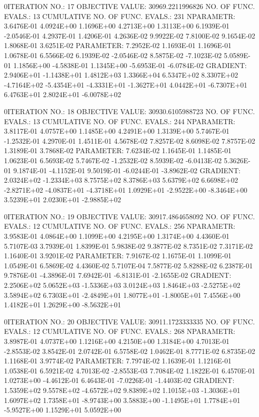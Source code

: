 \documentclass[
  letterpaper,
  toc=chapterentrywithdots,
  listof=totoc,
  11pt,
  headings=small,
  usegeometry]{scrreprt}
\begin{document}
\begin{nonmemlisting}
0ITERATION NO.:   17    OBJECTIVE VALUE:   30969.2211996826        NO. OF FUNC. EVALS.:  13
 CUMULATIVE NO. OF FUNC. EVALS.:      231
 NPARAMETR:  3.6476E-01  4.0924E+00  1.1696E+00  4.2713E+00  1.3113E+00  6.1939E-01 -2.0546E-01  4.2937E-01  1.4206E-01  4.2636E-02
             9.9922E-02  7.8100E-02  9.1654E-02  1.8068E-01  3.6251E-02
 PARAMETER:  7.2952E-02  1.1693E-01  1.1696E-01  1.0678E-01  6.5566E-02  6.1939E-02 -2.0546E-02  8.5875E-02 -7.1023E-02  5.0589E-01
             1.1856E+00 -4.5838E-01  1.1345E+00 -5.6953E-01 -6.0784E-02
 GRADIENT:   2.9406E+01 -1.1438E+01  1.4812E+03  1.3366E+04  6.5347E+02  8.3307E+02 -4.7164E+02 -5.4354E+01 -4.3331E+01 -1.3627E+01
             4.0442E+01 -6.7307E+01  6.4763E+01  2.8024E+01 -6.0078E+02

0ITERATION NO.:   18    OBJECTIVE VALUE:   30930.6105988723        NO. OF FUNC. EVALS.:  13
 CUMULATIVE NO. OF FUNC. EVALS.:      244
 NPARAMETR:  3.8117E-01  4.0757E+00  1.1485E+00  4.2491E+00  1.3139E+00  5.7467E-01 -1.2532E-01  4.2970E-01  1.4511E-01  4.5678E-02
             7.8257E-02  8.6098E-02  7.8757E-02  1.3189E-01  3.7868E-02
 PARAMETER:  7.6234E-02  1.1645E-01  1.1485E-01  1.0623E-01  6.5693E-02  5.7467E-02 -1.2532E-02  8.5939E-02 -6.0413E-02  5.3626E-01
             9.1874E-01 -4.1152E-01  9.5019E-01 -6.0244E-01 -3.8962E-02
 GRADIENT:   2.0324E+02 -1.2334E+03  8.7575E+02  8.3786E+03  5.6379E+02  6.6698E+02 -2.8271E+02 -4.0837E+01 -4.3718E+01  1.0929E+01
            -2.9522E+00 -8.3464E+00  3.5239E+01  2.0230E+01 -2.9885E+02

0ITERATION NO.:   19    OBJECTIVE VALUE:   30917.4864658092        NO. OF FUNC. EVALS.:  12
 CUMULATIVE NO. OF FUNC. EVALS.:      256
 NPARAMETR:  3.9583E-01  4.0864E+00  1.1099E+00  4.2195E+00  1.3174E+00  4.4360E-01  5.7107E-03  3.7939E-01  1.8399E-01  5.9838E-02
             9.3877E-02  8.7351E-02  7.3171E-02  1.1640E-01  3.9201E-02
 PARAMETER:  7.9167E-02  1.1675E-01  1.1099E-01  1.0549E-01  6.5869E-02  4.4360E-02  5.7107E-04  7.5877E-02  5.8288E-02  6.2387E-01
             9.7876E-01 -4.3896E-01  7.6942E-01 -6.8131E-01 -2.1655E-02
 GRADIENT:   2.2506E+02  5.0652E+03 -1.5336E+03  3.0124E+03  1.8464E+03 -2.5275E+02  3.5894E+02  6.7303E+01 -2.4849E+01  1.8077E+01
            -1.8005E+01  7.4556E+00  1.4182E+01  1.2629E+00 -8.5632E+01

0ITERATION NO.:   20    OBJECTIVE VALUE:   30911.1723333335        NO. OF FUNC. EVALS.:  12
 CUMULATIVE NO. OF FUNC. EVALS.:      268
 NPARAMETR:  3.8987E-01  4.0737E+00  1.1216E+00  4.2150E+00  1.3184E+00  4.7013E-01 -2.8553E-02  3.8542E-01  2.0742E-01  6.5758E-02
             1.0462E-01  8.7771E-02  6.8735E-02  1.1168E-01  3.9774E-02
 PARAMETER:  7.7974E-02  1.1639E-01  1.1216E-01  1.0538E-01  6.5921E-02  4.7013E-02 -2.8553E-03  7.7084E-02  1.1822E-01  6.4570E-01
             1.0273E+00 -4.4612E-01  6.4643E-01 -7.0226E-01 -1.4403E-02
 GRADIENT:   1.5359E+02  9.5578E+02 -4.6572E+02  9.8389E+02  1.1015E+03 -1.3036E+01  1.6097E+02  1.7358E+01 -8.9743E+00  3.5883E+00
            -1.1495E+01  1.7784E+01 -5.9527E+00  1.1529E+01  5.0592E+00


\end{nonmemlisting}
\end{document}

